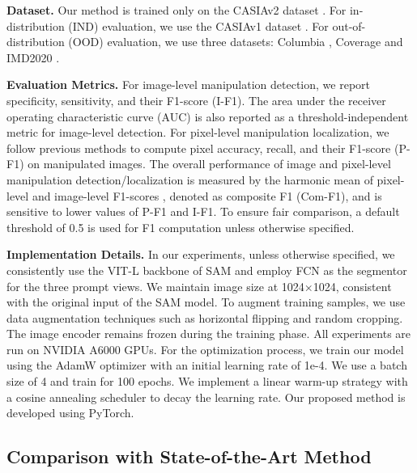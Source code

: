 




\noindent\textbf{Dataset.} Our method is trained only on the CASIAv2 dataset \cite{dong2013casia}. For in-distribution (IND) evaluation, we use the CASIAv1 dataset \cite{dong2013casia}. For out-of-distribution (OOD) evaluation, we use three datasets: Columbia \cite{hsu2006detecting}, Coverage \cite{wen2016coverage}and IMD2020 \cite{novozamsky2020imd2020}. 

\noindent\textbf{Evaluation Metrics.} For image-level manipulation detection, we report specificity, sensitivity, and their F1-score (I-F1). The area under the receiver operating characteristic curve (AUC) is also reported as a threshold-independent metric for image-level detection. For pixel-level manipulation localization, we follow previous methods\cite{chen2021image,zhou2018learning,zhou2018generate,salloum2018image} to compute pixel accuracy, recall, and their F1-score (P-F1) on manipulated images. The overall performance of image and pixel-level manipulation detection/localization is measured by the harmonic mean of pixel-level and image-level F1-scores \cite{chen2021image}, denoted as composite F1 (Com-F1), and is sensitive to lower values of P-F1 and I-F1. To ensure fair comparison, a default threshold of 0.5 is used for F1 computation unless otherwise specified.

\noindent\textbf{Implementation Details.} In our experiments, unless otherwise specified, we consistently use the VIT-L backbone of SAM and employ FCN as the segmentor for the three prompt views. We maintain image size at 1024×1024, consistent with the original input of the SAM model. To augment training samples, we use data augmentation techniques such as horizontal flipping and random cropping. The image encoder remains frozen during the training phase. All experiments are run on NVIDIA A6000 GPUs. For the optimization process, we train our model using the AdamW optimizer with an initial learning rate of 1e-4. We use a batch size of 4 and train for 100 epochs. We implement a linear warm-up strategy with a cosine annealing scheduler \cite{loshchilov2016sgdr} to decay the learning rate. Our proposed method is developed using PyTorch.

\subsection{
Comparison with State-of-the-Art Method}

